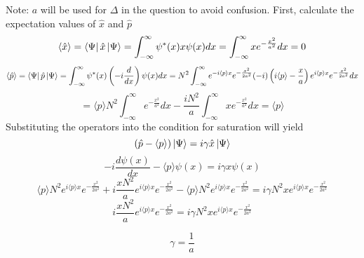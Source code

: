 \begin{sol}
Note: $a$ will be used for $\Delta$ in the question to avoid confusion.
First, calculate the expectation values of $\hat x$ and $\hat p$
\begin{equation}
	\langle \hat x\rangle=\bra\Psi\hat x\ket\Psi=\int_{-\infty}^\infty \psi^*(x)x\psi(x)dx=\int_{-\infty}^\infty xe^{-\frac{x^2}{a^2}}dx=0
\end{equation} \begin{equation}
	\langle \hat p\rangle=\bra\Psi\hat p\ket\Psi=\int_{-\infty}^\infty\psi^*(x)\left(-i\frac{d}{dx}\right)\psi(x)dx=N^2\int_{-\infty}^\infty e^{-i\langle p\rangle x}e^{-\frac{x^2}{2a^2}}(-i)\left(i\langle p\rangle-\frac{x}{a}\right)e^{i\langle p\rangle x}e^{-\frac{x^2}{2a^2}}dx
\end{equation}  \begin{equation}
	=\langle p\rangle N^2\int_{-\infty}^\infty e^{-\frac{x^2}{a^2}}dx-\frac{iN^2}{a}\int_{-\infty}^\infty x e^{-\frac{x^2}{a^2}}dx=\langle p\rangle 
\end{equation} 
Substituting the operators into the condition for saturation will yield
\begin{equation}
	(\hat p-\langle p\rangle)\ket\Psi=i\gamma\hat x\ket\Psi
\end{equation} 
\begin{equation}
	-i\frac{d\psi(x)}{dx}-\langle p\rangle \psi(x)=i\gamma x\psi(x)
\end{equation} 
\begin{equation}
	\langle p\rangle N^2e^{i\langle p\rangle x}e^{-\frac{x^2}{2a^2}}+i\frac{x N^2}{a}e^{i\langle p\rangle x}e^{-\frac{x^2}{2a^2}}-\langle p\rangle N^2 e^{i\langle p\rangle x}e^{-\frac{x^2}{2a^2}}=i\gamma  N^2x e^{i\langle p\rangle x}e^{-\frac{x^2}{2a^2}}
\end{equation} 
\begin{equation}
	i\frac{x N^2}{a}e^{i\langle p\rangle x}e^{-\frac{x^2}{2a^2}}=i\gamma  N^2x e^{i\langle p\rangle x}e^{-\frac{x^2}{2a^2}}
\end{equation}


\begin{equation}
	\gamma=\frac{1}{a}
\end{equation} 
\end{sol}